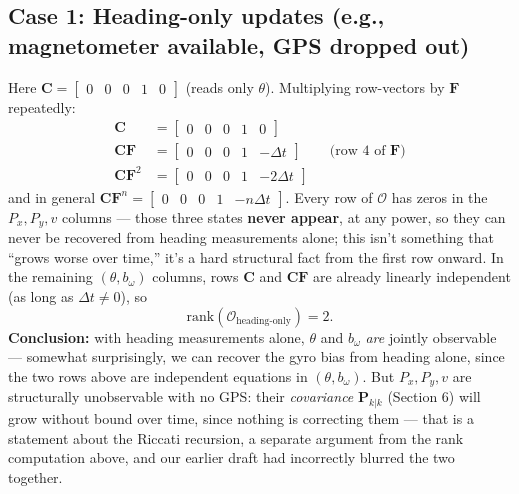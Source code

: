 \documentclass[11pt,a4paper]{article}
\begin{document}
\subsection{Case 1: Heading-only updates (e.g., magnetometer available, GPS dropped out)}
Here $\mathbf{C} = \begin{bmatrix}0&0&0&1&0\end{bmatrix}$ (reads only $\theta$). Multiplying row-vectors by $\mathbf{F}$ repeatedly:
\begin{align}
    \mathbf{C} &= \begin{bmatrix}0&0&0&1&0\end{bmatrix} \\
    \mathbf{C}\mathbf{F} &= \begin{bmatrix}0&0&0&1&-\Delta t\end{bmatrix} \qquad \text{(row 4 of }\mathbf{F}\text{)} \\
    \mathbf{C}\mathbf{F}^2 &= \begin{bmatrix}0&0&0&1&-2\Delta t\end{bmatrix}
\end{align}
and in general $\mathbf{C}\mathbf{F}^n = \begin{bmatrix}0&0&0&1&-n\Delta t\end{bmatrix}$. Every row of $\mathcal{O}$ has zeros in the $P_x, P_y, v$ columns --- those three states \textbf{never appear}, at any power, so they can never be recovered from heading measurements alone; this isn't something that ``grows worse over time,'' it's a hard structural fact from the first row onward. In the remaining $(\theta, b_\omega)$ columns, rows $\mathbf{C}$ and $\mathbf{C}\mathbf{F}$ are already linearly independent (as long as $\Delta t \neq 0$), so
\begin{equation}
    \mathrm{rank}(\mathcal{O}_{\text{heading-only}}) = 2.
\end{equation}
\textbf{Conclusion:} with heading measurements alone, $\theta$ and $b_\omega$ \emph{are} jointly observable --- somewhat surprisingly, we can recover the gyro bias from heading alone, since the two rows above are independent equations in $(\theta, b_\omega)$. But $P_x, P_y, v$ are structurally unobservable with no GPS: their \emph{covariance} $\mathbf{P}_{k|k}$ (Section 6) will grow without bound over time, since nothing is correcting them --- that is a statement about the Riccati recursion, a separate argument from the rank computation above, and our earlier draft had incorrectly blurred the two together.
\end{document}
